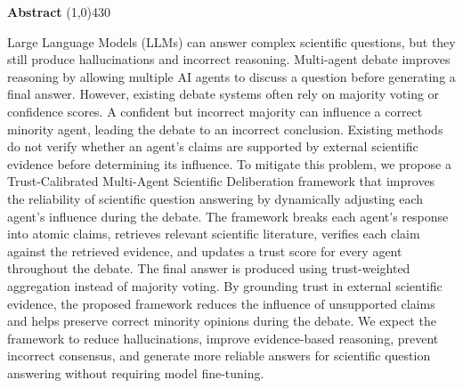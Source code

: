 \setlength{\headheight}{14pt}
\begin{center}
	{\huge \bf Abstract}
	\line(1,0){430}
\end{center}


Large Language Models (LLMs) can answer complex scientific questions, but they still produce hallucinations and incorrect reasoning. Multi-agent debate improves reasoning by allowing multiple AI agents to discuss a question before generating a final answer. However, existing debate systems often rely on majority voting or confidence scores. A confident but incorrect majority can influence a correct minority agent, leading the debate to an incorrect conclusion. Existing methods do not verify whether an agent's claims are supported by external scientific evidence before determining its influence. To mitigate this problem, we propose a Trust-Calibrated Multi-Agent Scientific Deliberation framework that improves the reliability of scientific question answering by dynamically adjusting each agent's influence during the debate. The framework breaks each agent's response into atomic claims, retrieves relevant scientific literature, verifies each claim against the retrieved evidence, and updates a trust score for every agent throughout the debate. The final answer is produced using trust-weighted aggregation instead of majority voting. By grounding trust in external scientific evidence, the proposed framework reduces the influence of unsupported claims and helps preserve correct minority opinions during the debate. We expect the framework to reduce hallucinations, improve evidence-based reasoning, prevent incorrect consensus, and generate more reliable answers for scientific question answering without requiring model fine-tuning.

\clearpage
\setlength{\headheight}{12pt}
